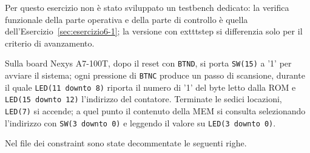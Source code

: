 
\simulazione

Per questo esercizio non è stato sviluppato un testbench dedicato: la verifica funzionale della parte operativa e della parte di controllo è quella dell'Esercizio~\ref{sec:esercizio6-1}; la versione con 	exttt{step} si differenzia solo per il criterio di avanzamento.

\sintesiboard

Sulla board Nexys A7-100T, dopo il reset con \texttt{BTND}, si porta \texttt{SW(15)} a '1' per avviare il sistema; ogni pressione di \texttt{BTNC} produce un passo di scansione, durante il quale \texttt{LED(11 downto 8)} riporta il numero di '1' del byte letto dalla ROM e \texttt{LED(15 downto 12)} l'indirizzo del contatore. Terminate le sedici locazioni, \texttt{LED(7)} si accende; a quel punto il contenuto della MEM si consulta selezionando l'indirizzo con \texttt{SW(3 downto 0)} e leggendo il valore su \texttt{LED(3 downto 0)}.

Nel file dei constraint sono state decommentate le seguenti righe.

